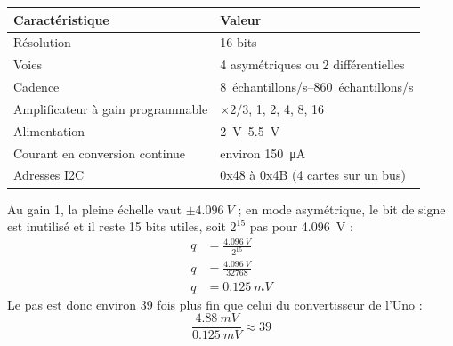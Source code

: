 \noindent
\begin{table}[H]
\centering
\begin{tabularx}{\linewidth}{lY}
\hline
Caractéristique & Valeur \\
\hline
Résolution & 16 bits \\
Voies & 4 asymétriques ou 2 différentielles \\
Cadence & \qtyrange{8}{860}{échantillons/s} \\
Amplificateur à gain programmable & $\times 2/3$, 1, 2, 4, 8, 16 \\
Alimentation & \qtyrange{2}{5,5}{V} \\
Courant en conversion continue & environ \qty{150}{\micro A} \\
Adresses I2C & 0x48 à 0x4B (4 cartes sur un bus) \\
\hline
\end{tabularx}
\end{table}
Au gain 1, la pleine échelle vaut $\pm\qty{4,096}{V}$ ; en mode asymétrique, le bit de signe est inutilisé et il reste 15 bits utiles, soit $2^{15}$ pas pour \qty{4,096}{V} :
\begin{align*}
q &= \frac{\qty{4,096}{V}}{2^{15}}\\
q &= \frac{\qty{4,096}{V}}{32768}\\
q &= \qty{0,125}{mV}
\end{align*}
Le pas est donc environ 39 fois plus fin que celui du convertisseur de l'Uno :
\[
\frac{\qty{4,88}{mV}}{\qty{0,125}{mV}} \approx 39
\]

